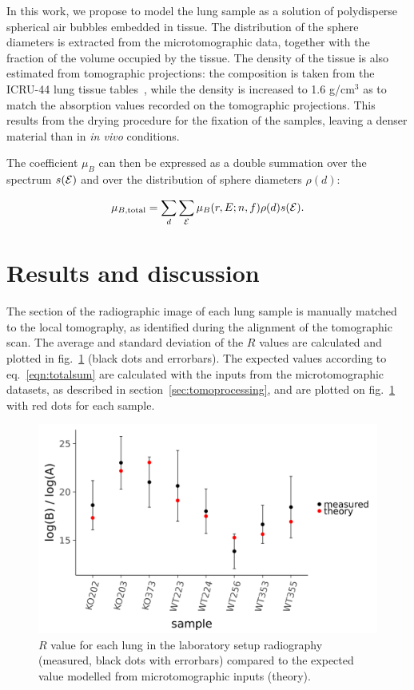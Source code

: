 In this work, we propose to model the lung sample as a solution of
polydisperse spherical air bubbles embedded in tissue. The distribution of
the sphere diameters is extracted from the microtomographic data, together
with the fraction of the volume occupied by the tissue. The density of the
tissue is also estimated from tomographic projections: the composition is
taken from the ICRU-44 lung tissue tables~\cite{White_1989}, while the density is increased to
1.6 g/cm$^3$ as to match the absorption values recorded on the tomographic
projections. This results from the drying procedure for the fixation of
the samples, leaving a denser material than in \emph{in vivo} conditions.

The coefficient $\mu_B$ can then be expressed as a double summation over the spectrum
$s(\mathcal{E})$ and over the distribution of sphere diameters $\rho(d)$:

\begin{equation}
    \mu_{B,\text{total}} = \sum_{d}\sum_{\mathcal{E}} \mu_B(r, E; n, f)\rho(d)s(\mathcal{E})
    \label{eqn:totalsum}.
\end{equation}


\section{Results and discussion}\label{sec:results}
The section of the radiographic image of each lung sample is manually
matched to the local tomography, as identified during the alignment of the
tomographic scan. The average and standard deviation of the $R$ values are
calculated and plotted in fig.~\ref{206272} (black dots and errorbars). The expected
values according to eq.~\ref{eqn:totalsum} are calculated with the inputs from the
microtomographic datasets, as described in section~\ref{sec:tomoprocessing}, and are plotted on
fig.~\ref{206272} with red dots for each sample.
\begin{figure}[h!]
\begin{center}
\includegraphics[width=0.70\columnwidth]{gfx/lung-paper-figures/samples/samples}
\caption{{\(R\) value for each lung in the laboratory setup
radiography (measured, black dots with errorbars) compared to the
expected value modelled from microtomographic inputs (theory).
{\label{206272}}%
}}
\end{center}
\end{figure}


